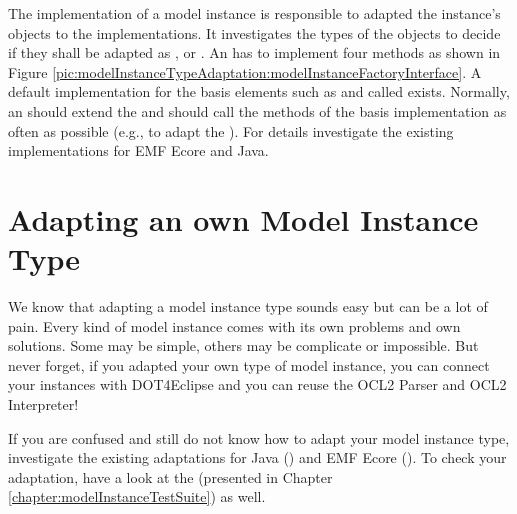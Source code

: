 The  implementation of a model instance is responsible to adapted the instance's objects to the  implementations. It investigates the types of the objects to decide if they shall be adapted as ,  or . An  has to implement four methods as shown in Figure \ref{pic:modelInstanceTypeAdaptation:modelInstanceFactoryInterface}. A default implementation for the basis elements such as  and  called  exists. Normally, an  should extend the  and should call the methods of the basis implementation as often as possible (e.g., to adapt the ). For details investigate the existing implementations for \acs{EMF} Ecore and Java.



\section{Adapting an own Model Instance Type}

We know that adapting a model instance type sounds easy but can be a lot of pain. Every kind of model instance comes with its own problems and own solutions. Some may be simple, others may be complicate or impossible. But never forget, if you adapted your own type of model instance, you can connect your instances with \acl{DOT4Eclipse} and you can reuse the \acs{OCL}2 Parser and \acs{OCL}2 Interpreter! 

If you are confused and still do not know how to adapt your model instance type, investigate the existing adaptations for Java () and \acs{EMF} Ecore (). To check your adaptation, have a look at the  (presented in Chapter \ref{chapter:modelInstanceTestSuite}) as well.